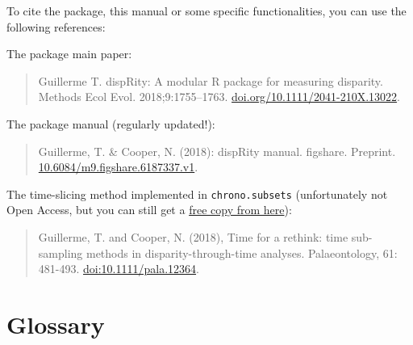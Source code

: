 \documentclass[]{book}
\theoremstyle{definition}
\theoremstyle{definition}
\theoremstyle{definition}
\theoremstyle{remark}
\begin{document}
To cite the package, this manual or some specific functionalities, you
can use the following references:

The package main paper:

\begin{quote}
Guillerme T. dispRity: A modular R package for measuring disparity.
Methods Ecol Evol. 2018;9:1755--1763.
\href{https://doi.org/10.1111/2041-210X.13022}{doi.org/10.1111/2041-210X.13022}.
\end{quote}

The package manual (regularly updated!):

\begin{quote}
Guillerme, T. \& Cooper, N. (2018): dispRity manual. figshare. Preprint.
\href{https://doi.org/10.6084/m9.figshare.6187337.v1}{10.6084/m9.figshare.6187337.v1}.
\end{quote}

The time-slicing method implemented in \texttt{chrono.subsets}
(unfortunately not Open Access, but you can still get a
\href{https://tguillerme.github.io/papers/Guillerme\&Cooper-2018-Palaeontology.pdf}{free
copy from here}):

\begin{quote}
Guillerme, T. and Cooper, N. (2018), Time for a rethink: time
sub-sampling methods in disparity-through-time analyses. Palaeontology,
61: 481-493.
\href{https://onlinelibrary.wiley.com/doi/abs/10.1111/pala.12364}{doi:10.1111/pala.12364}.
\end{quote}

\chapter{Glossary}\label{glossary}
\end{document}
